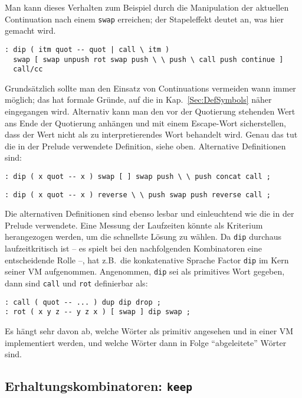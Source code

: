 Man kann dieses Verhalten zum Beispiel durch die Manipulation der aktuellen Continuation nach einem \verb|swap| erreichen; der Stapeleffekt deutet an, was hier gemacht wird.

\begin{verbatim}
: dip ( itm quot -- quot | call \ itm )
  swap [ swap unpush rot swap push \ \ push \ call push continue ]
  call/cc
\end{verbatim}

Grundsätzlich sollte man den Einsatz von Continuations vermeiden wann immer möglich; das hat formale Gründe, auf die in Kap.~\ref{Sec:DefSymbols} näher eingegangen wird.
Alternativ kann man den vor der Quotierung stehenden Wert ans Ende der Quotierung anhängen und mit einem Escape-Wort sicherstellen, dass der Wert nicht als zu interpretierendes Wort behandelt wird. Genau das tut die in der Prelude verwendete Definition, siehe oben. Alternative Definitionen sind:

\begin{verbatim}
: dip ( x quot -- x ) swap [ ] swap push \ \ push concat call ;
\end{verbatim}

\begin{verbatim}
: dip ( x quot -- x ) reverse \ \ push swap push reverse call ;
\end{verbatim}

Die alternativen Definitionen sind ebenso lesbar und einleuchtend wie die in der Prelude verwendete. Eine Messung der Laufzeiten könnte als Kriterium herangezogen werden, um die schnellste Lösung zu wählen. Da \verb|dip| durchaus laufzeitkritisch ist -- es spielt bei den nachfolgenden Kombinatoren eine entscheidende Rolle --, hat z.B.\ die konkatenative Sprache Factor \verb|dip| im Kern seiner VM aufgenommen. Angenommen, \verb|dip| sei als primitives Wort gegeben, dann sind \verb|call| und \verb|rot| definierbar als:

\begin{verbatim}
: call ( quot -- ... ) dup dip drop ;
: rot ( x y z -- y z x ) [ swap ] dip swap ;
\end{verbatim}

Es hängt sehr davon ab, welche Wörter als primitiv angesehen und in einer VM implementiert werden, und welche Wörter dann in Folge "`abgeleitete"' Wörter sind.

\subsection{Erhaltungskombinatoren: \texttt{keep}}

